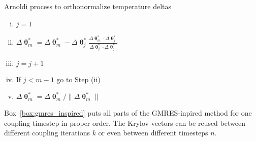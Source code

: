 \begin{framedbox}[htbp]
  \caption{Arnoldi process to orthonormalize temperature deltas}
  \label{box:arnoldi_process}
  \begin{center}
    \begin{minipage}{0.9\textwidth}
    \begin{enumerate}[(i)]
      \item \(j=1\)
      \item \(\Delta \bm\uptheta^*_m = \Delta \bm\uptheta^*_m - \Delta \bm\uptheta^*_j\frac{\Delta\bm\uptheta^*_m\cdot\Delta\bm\uptheta^*_j}{\Delta\bm \uptheta^*_j\cdot\Delta\bm\uptheta^*_j}\)
      \item \(j=j+1\)
      \item If \(j<m-1\) go to Step (ii)
      \item \(\Delta\bm \uptheta^*_m = \Delta\bm\uptheta^*_m/\|\Delta \bm \uptheta^*_m\|\)
    \end{enumerate}
    \end{minipage}
  \end{center}
\end{framedbox}


Box~\ref{box:gmres_inspired} puts all parts of the GMRES-inpired method for one coupling timestep in proper order. The Krylov-vectors can be reused between different coupling iterations $k$ or even between different timesteps $n$.

